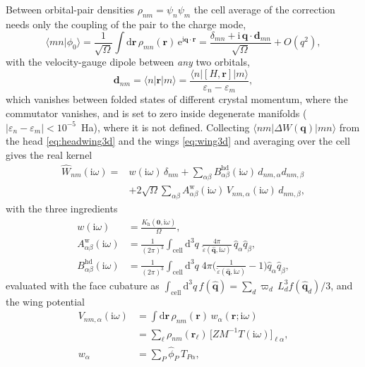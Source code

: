 \documentclass[%
 reprint,
superscriptaddress,
 amsmath,amssymb,
 aps,
prb,
]{revtex4-2}
\newcommand{\br}{\mathbf{r}}
\newcommand{\bq}{\mathbf{q}}
\newcommand{\qhat}{\hat{\mathbf{q}}}
\newcommand{\dd}{\mathrm{d}}
\newcommand{\ii}{\mathrm{i}}
\newcommand{\ee}{\mathrm{e}}
\newcommand{\head}{\mathrm{h}}
\newcommand{\wing}{\mathrm{w}}
\newcommand{\hd}{\mathrm{hd}}
\begin{document}
Between orbital-pair densities $\rho_{nm} = \psi_n\psi_m$ the cell average of the correction
needs only the coupling of the pair to the charge mode,
\begin{equation}
  \langle mn|\phi_0\rangle = \frac{1}{\sqrt\Omega}\int\dd\br\,\rho_{mn}(\br)\,\ee^{\ii\bq\cdot\br}
  = \frac{\delta_{mn} + \ii\,\bq\cdot\mathbf d_{mn}}{\sqrt\Omega} + O(q^2),
  \label{eq:pair_phi0}
\end{equation}
with the velocity-gauge dipole between \emph{any} two orbitals,
\begin{equation}
  \mathbf d_{nm} = \langle n|\br|m\rangle
  = \frac{\langle n|[H,\br]|m\rangle}{\varepsilon_n - \varepsilon_m},
  \label{eq:dnm}
\end{equation}
which vanishes between folded states of different crystal momentum, where the commutator
vanishes, and is set to zero inside degenerate manifolds ($|\varepsilon_n-\varepsilon_m|<10^{-5}$~Ha),
where it is not defined. Collecting $\langle nm|\Delta W(\bq)|mn\rangle$ from the head
\eqref{eq:headwing3d} and the wings \eqref{eq:wing3d} and averaging over the cell gives the
real kernel
\begin{equation}
\begin{aligned}
  \hat W_{nm}(\ii\omega) ={}& w(\ii\omega)\,\delta_{nm}
  + \sum_{\alpha\beta} B^\hd_{\alpha\beta}(\ii\omega)\, d_{nm,\alpha} d_{nm,\beta}\\
  &+ 2\sqrt\Omega\sum_{\alpha\beta} A^\wing_{\alpha\beta}(\ii\omega)\,
  V_{nm,\alpha}(\ii\omega)\, d_{nm,\beta},
\end{aligned}
  \label{eq:What}
\end{equation}
with the three ingredients
\begin{align}
  w(\ii\omega) &= \frac{K_\head(\mathbf 0,\ii\omega)}{\Omega},
  \label{eq:headpot}\\
  A^\wing_{\alpha\beta}(\ii\omega) &= \frac{1}{(2\pi)^3}\int_\mathrm{cell}\dd^3q\;
  \frac{4\pi}{\tilde\varepsilon(\qhat,\ii\omega)}\,\hat q_\alpha\hat q_\beta,
  \label{eq:Awing}\\
  B^\hd_{\alpha\beta}(\ii\omega) &= \frac{1}{(2\pi)^3}\int_\mathrm{cell}\dd^3q\;
  4\pi\Big(\frac{1}{\tilde\varepsilon(\qhat,\ii\omega)} - 1\Big)\hat q_\alpha\hat q_\beta,
  \label{eq:Bhd}
\end{align}
evaluated with the face cubature as
$\int_\mathrm{cell}\dd^3q\,f(\qhat) = \sum_d\varpi_d\,L_d^3 f(\qhat_d)/3$, and the wing potential
\begin{equation}
\begin{aligned}
  V_{nm,\alpha}(\ii\omega) &= \int\dd\br\,\rho_{nm}(\br)\,w_\alpha(\br;\ii\omega)\\
  &= \sum_\ell \rho_{nm}(\br_\ell)\,\big[Z M^{-1} T(\ii\omega)\big]_{\ell\alpha},\\
  w_\alpha &= \sum_P \hat\phi_P\,T_{P\alpha},
\end{aligned}
  \label{eq:Vnm}
\end{equation}
\end{document}
